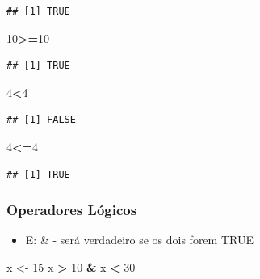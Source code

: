 \documentclass[
]{book}
\newenvironment{Shaded}{\begin{snugshade}}{\end{snugshade}}
\newcommand{\DecValTok}[1]{\textcolor[rgb]{0.00,0.00,0.81}{#1}}
\newcommand{\NormalTok}[1]{#1}
\newcommand{\OperatorTok}[1]{\textcolor[rgb]{0.81,0.36,0.00}{\textbf{#1}}}
\newcommand{\StringTok}[1]{\textcolor[rgb]{0.31,0.60,0.02}{#1}}
\providecommand{\tightlist}{%
  \setlength{\itemsep}{0pt}\setlength{\parskip}{0pt}}
\begin{document}
\begin{verbatim}
## [1] TRUE
\end{verbatim}

\begin{Shaded}
\begin{Highlighting}[]
\DecValTok{10}\OperatorTok{>=}\DecValTok{10}
\end{Highlighting}
\end{Shaded}

\begin{verbatim}
## [1] TRUE
\end{verbatim}

\begin{Shaded}
\begin{Highlighting}[]
\DecValTok{4}\OperatorTok{<}\DecValTok{4}
\end{Highlighting}
\end{Shaded}

\begin{verbatim}
## [1] FALSE
\end{verbatim}

\begin{Shaded}
\begin{Highlighting}[]
\DecValTok{4}\OperatorTok{<=}\DecValTok{4}
\end{Highlighting}
\end{Shaded}

\begin{verbatim}
## [1] TRUE
\end{verbatim}

\hypertarget{operadores-luxf3gicos}{%
\subsubsection{Operadores Lógicos}\label{operadores-luxf3gicos}}

\begin{itemize}
\tightlist
\item
  E: \& - será verdadeiro se os dois forem TRUE
\end{itemize}

\begin{Shaded}
\begin{Highlighting}[]
\NormalTok{x <-}\StringTok{ }\DecValTok{15}
\NormalTok{x }\OperatorTok{>}\StringTok{ }\DecValTok{10} \OperatorTok{&}\StringTok{ }\NormalTok{x }\OperatorTok{<}\StringTok{ }\DecValTok{30}
\end{Highlighting}
\end{Shaded}
\end{document}
